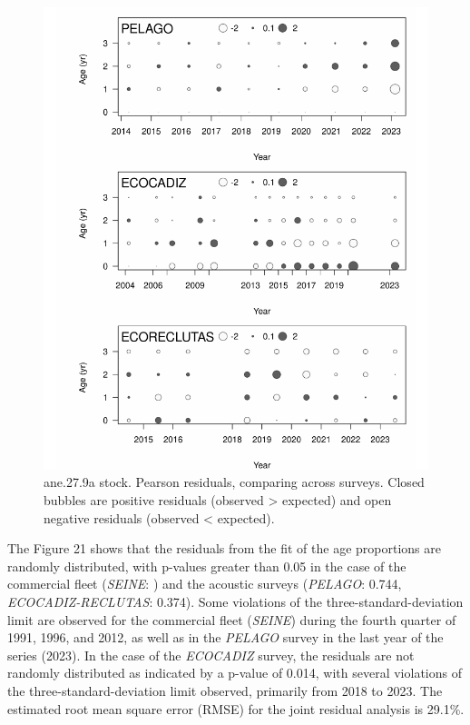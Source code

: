 \documentclass[
]{article}
\begin{document}
\begin{figure}[H]

{\centering \includegraphics[width=0.95\linewidth]{Report_SS3_quarter_with_age_data_S1.0_4FLEETS_files/figure-latex/unnamed-chunk-27-1} 

}

\caption{ane.27.9a stock.  Pearson residuals, comparing across surveys. Closed bubbles are positive residuals (observed > expected) and open negative residuals (observed < expected).}\label{fig:unnamed-chunk-27}
\end{figure}

The Figure 21 shows that the residuals from the fit of the age
proportions are randomly distributed, with p-values greater than 0.05 in
the case of the commercial fleet (\emph{SEINE}: ) and the acoustic
surveys (\emph{PELAGO}: 0.744, \emph{ECOCADIZ-RECLUTAS}: 0.374). Some
violations of the three-standard-deviation limit are observed for the
commercial fleet (\emph{SEINE}) during the fourth quarter of 1991, 1996,
and 2012, as well as in the \emph{PELAGO} survey in the last year of the
series (2023). In the case of the \emph{ECOCADIZ} survey, the residuals
are not randomly distributed as indicated by a p-value of 0.014, with
several violations of the three-standard-deviation limit observed,
primarily from 2018 to 2023. The estimated root mean square error (RMSE)
for the joint residual analysis is 29.1\%.
\end{document}
